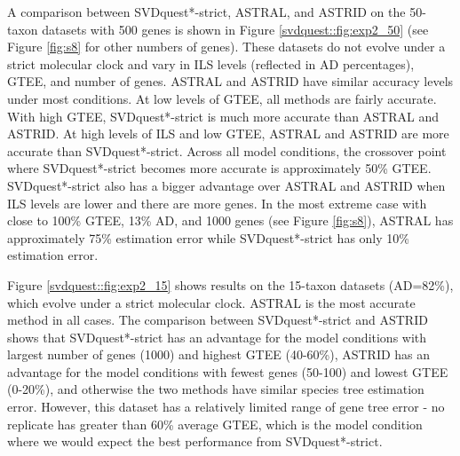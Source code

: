 

{A comparison between SVDquest*-strict, ASTRAL, and ASTRID} on the 50-taxon datasets with 500 genes is shown in Figure \ref{svdquest::fig:exp2_50}
({see Figure \ref{fig:s8} for other numbers of genes}).
These datasets do
not evolve under a strict molecular clock and vary in ILS levels
(reflected in AD percentages), GTEE, and number of genes.  ASTRAL and
ASTRID have similar accuracy levels under most conditions.  At low
levels of GTEE, all methods are fairly accurate.  With high GTEE,
SVDquest*-strict is much more accurate than ASTRAL and ASTRID. 
At high levels
of ILS and low GTEE, ASTRAL and ASTRID are more accurate than
SVDquest*-strict.  Across all model conditions, the crossover point where
SVDquest*-strict becomes more accurate is approximately 50\% GTEE. 
SVDquest*-strict
also has a bigger advantage over ASTRAL and ASTRID when ILS levels are
lower and there are more genes. 
In the most extreme case with close to
100\% GTEE, 13\% AD, and 1000 genes
{(see Figure \ref{fig:s8})},
ASTRAL  has approximately 75\% estimation error while
SVDquest*-strict has only 10\% estimation error. 

Figure \ref{svdquest::fig:exp2_15} shows results on the 15-taxon datasets (AD=82\%), which
evolve under a strict molecular clock. 
ASTRAL is the most accurate method in all cases. 
The comparison between SVDquest*-strict and ASTRID shows that SVDquest*-strict
has an advantage for the model conditions with largest number of genes (1000) and highest GTEE (40-60\%),
ASTRID has an advantage for the model conditions with fewest genes (50-100) and lowest GTEE (0-20\%), and
otherwise the two methods have similar species
tree estimation error. 
However, this dataset has a relatively limited
range of gene tree error - no replicate has greater than 60\% average
GTEE, which is the model condition where we would expect the best
performance from SVDquest*-strict. 

